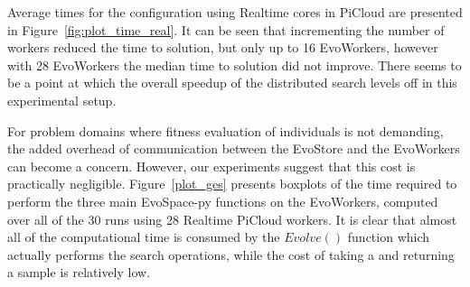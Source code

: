 Average times for the configuration using Realtime cores in PiCloud
are presented in Figure~\ref{fig:plot_time_real}. It can be seen that
incrementing the number of workers reduced the time to solution, but only up to 16 EvoWorkers,
however with 28 EvoWorkers the median time to solution did not improve.
There seems to be a point at which the overall speedup of the distributed search levels off in this experimental setup.

For problem domains where fitness evaluation of individuals is not demanding, the added overhead of communication between the EvoStore and the EvoWorkers
can become a concern.
However, our experiments suggest that this cost is practically negligible.
Figure~\ref{plot_ges} presents boxplots of the time required to perform the
three main EvoSpace-py functions on the EvoWorkers, computed over all of the 30 runs using 28 Realtime PiCloud workers.
It is clear that almost all of the computational time is consumed by the $Evolve()$ function which actually performs the search operations,
while the cost of taking a and returning a sample is relatively low.


